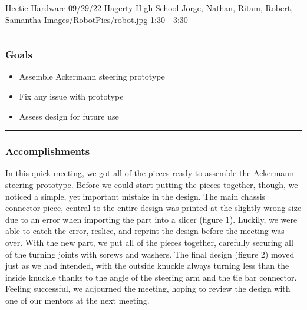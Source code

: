 \insertmeeting 
	{Hectic Hardware} 
	{09/29/22} 
	{Hagerty High School}
	{Jorge, Nathan, Ritam, Robert, Samantha}
	{Images/RobotPics/robot.jpg}
	{1:30 - 3:30}
	

\noindent\hfil\rule{\textwidth}{.4pt}\hfil
\subsubsection*{Goals}
\begin{itemize}
    \item Assemble Ackermann steering prototype
    \item Fix any issue with prototype
    \item Assess design for future use



\end{itemize} 

\noindent\hfil\rule{\textwidth}{.4pt}\hfil

\subsubsection*{Accomplishments}
In this quick meeting, we got all of the pieces ready to assemble the Ackermann steering prototype. Before we could start putting the pieces together, though, we noticed a simple, yet important mistake in the design. The main chassis connector piece, central to the entire design was printed at the slightly wrong size due to an error when importing the part into a slicer (figure 1). Luckily, we were able to catch the error, reslice, and reprint the design before the meeting was over. With the new part, we put all of the pieces together, carefully securing all of the turning joints with screws and washers. The final design (figure 2) moved just as we had intended, with the outside knuckle always turning less than the inside knuckle thanks to the angle of the steering arm and the tie bar connector. Feeling successful, we adjourned the meeting, hoping to review the design with one of our mentors at the next meeting.


 

